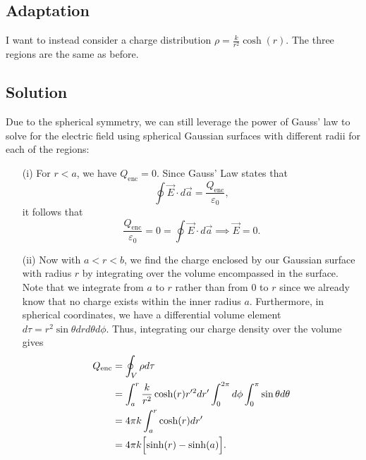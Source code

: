 \documentclass{article}
\begin{document}
\subsection*{Adaptation}
I want to instead consider a charge distribution $\rho = \frac{k}{r^2}\cosh(r)$. The three regions are the same as before.

\subsection*{Solution}
Due to the spherical symmetry, we can still leverage the power of Gauss' law to solve for the electric field using spherical Gaussian surfaces with different radii for each of the regions:
\begin{itemize}
	\item[(i)] For $r < a$, we have $Q_\textrm{enc}=0$. Since Gauss' Law states that
	\begin{equation}
		\oint\vec{E}\cdot d\vec{a} = \frac{Q_\textrm{enc}}{\varepsilon_0},
	\end{equation}
	it follows that
	\begin{equation}
		\frac{Q_\textrm{enc}}{\varepsilon_0} = 0 = \oint\vec{E}\cdot d\vec{a} \implies \boxed{\vec{E} = 0}.
	\end{equation}

	\item[(ii)] Now with $a < r < b$, we find the charge enclosed by our Gaussian surface with radius $r$ by integrating over the volume encompassed in the surface. Note that we integrate from $a$ to $r$ rather than from $0$ to $r$ since we already know that no charge exists within the inner radius $a$. Furthermore, in spherical coordinates, we have a differential volume element $d\tau = r^2\sin\theta drd\theta d\phi$. Thus, integrating our charge density over the volume gives
	\begin{align*}
		Q_\textrm{enc} &= \oint_V \rho d\tau\\
		&= \int_{a}^{r} \frac{k}{r^2}\cosh(r) r'^2dr' \int_{0}^{2\pi} d\phi \int_{0}^{\pi} \sin\theta d\theta \\
		&= 4\pi k\int_a^r \cosh(r) dr' \\
		&= 4\pi k \Bigl[\sinh(r) - \sinh(a)\Bigr].
	\end{align*}
	

\end{itemize}
\end{document}

